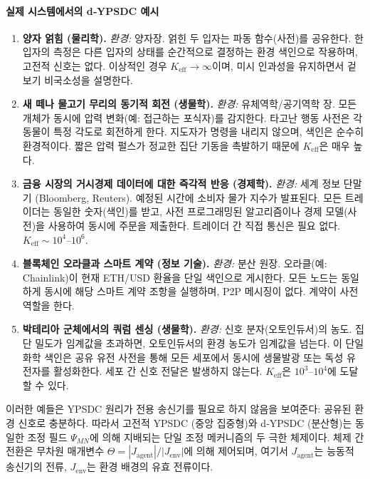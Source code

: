 \documentclass[11pt,a4paper]{article}
\begin{document}
\paragraph*{실제 시스템에서의 d‑YPSDC 예시}
\begin{enumerate}[leftmargin=*]
	\item \textbf{양자 얽힘 (물리학).}
	\textit{환경:} 양자장. 얽힌 두 입자는 파동 함수(사전)를 공유한다. 한 입자의 측정은 다른 입자의 상태를 순간적으로 결정하는 환경 색인으로 작용하며, 고전적 신호는 없다. 이상적인 경우 $K_{\mathrm{eff}}\to\infty$이며, 미시 인과성을 유지하면서 겉보기 비국소성을 설명한다.
	
	\item \textbf{새 떼나 물고기 무리의 동기적 회전 (생물학).}
	\textit{환경:} 유체역학/공기역학 장. 모든 개체가 동시에 압력 변화(예: 접근하는 포식자)를 감지한다. 타고난 행동 사전은 각 동물이 특정 각도로 회전하게 한다. 지도자가 명령을 내리지 않으며, 색인은 순수히 환경적이다. 짧은 압력 펄스가 정교한 집단 기동을 촉발하기 때문에 $K_{\mathrm{eff}}$은 매우 높다.
	
	\item \textbf{금융 시장의 거시경제 데이터에 대한 즉각적 반응 (경제학).}
	\textit{환경:} 세계 정보 단말기 (Bloomberg, Reuters). 예정된 시간에 소비자 물가 지수가 발표된다. 모든 트레이더는 동일한 숫자(색인)를 받고, 사전 프로그래밍된 알고리즘이나 경제 모델(사전)을 사용하여 동시에 주문을 제출한다. 트레이더 간 직접 통신은 필요 없다. $K_{\mathrm{eff}}\sim 10^{4}$--$10^{6}$.
	
	\item \textbf{블록체인 오라클과 스마트 계약 (정보 기술).}
	\textit{환경:} 분산 원장. 오라클(예: Chainlink)이 현재 ETH/USD 환율을 단일 색인으로 게시한다. 모든 노드는 동일하게 동시에 해당 스마트 계약 조항을 실행하며, P2P 메시징이 없다. 계약이 사전 역할을 한다.
	
	\item \textbf{박테리아 군체에서의 쿼럼 센싱 (생물학).}
	\textit{환경:} 신호 분자(오토인듀서)의 농도. 집단 밀도가 임계값을 초과하면, 오토인듀서의 환경 농도가 임계값을 넘는다. 이 단일 화학 색인은 공유 유전 사전을 통해 모든 세포에서 동시에 생물발광 또는 독성 유전자를 활성화한다. 세포 간 신호 전달은 발생하지 않는다. $K_{\mathrm{eff}}$은 $10^{3}$--$10^{4}$에 도달할 수 있다.
\end{enumerate}

이러한 예들은 YPSDC 원리가 전용 송신기를 필요로 하지 않음을 보여준다: 공유된 환경 신호로 충분하다. 따라서 고전적 YPSDC (중앙 집중형)와 d‑YPSDC (분산형)는 동일한 조정 필드 $\Psi_{MN}$에 의해 지배되는 단일 조정 메커니즘의 두 극한 체제이다. 체제 간 전환은 무차원 매개변수 $\Theta = |J_{\mathrm{agent}}|/|J_{\mathrm{env}}|$에 의해 제어되며, 여기서 $J_{\mathrm{agent}}$는 능동적 송신기의 전류, $J_{\mathrm{env}}$는 환경 배경의 유효 전류이다.
\end{document}
